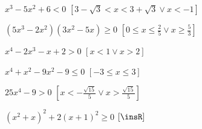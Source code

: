 \begin{esercizio}[\Ast]
\begin{enumeratea}
\item $x^3-5x^2+6<0$ \hfill $\left[3-\sqrt 3<x<3+\sqrt 3\vee x<-1\right]$
\item $\left(5x^3-2x^2\right)\left(3x^2-5x\right)\ge 0$ 
 \hfill $\left[0\le x\le \frac 2 5\vee x\ge \frac 5 3\right]$
\item $x^4-2x^3-x+2>0$ \hfill $\left[x<1\vee x>2\right]$
\item $x^4+x^2-9x^2-9\le 0$ \hfill $\left[-3\le x\le 3\right]$
\item $25x^4-9>0$ 
 \hfill $\left[x<-\frac{\sqrt{15}} 5\vee x>\frac{\sqrt{15}} 5\right]$
\item $\left(x^2+x\right)^2+2\left(x+1\right)^2\ge 0$ 
 \hfill $\left[\insR\right]$
\end{enumeratea}
\end{esercizio}
% 
% 
